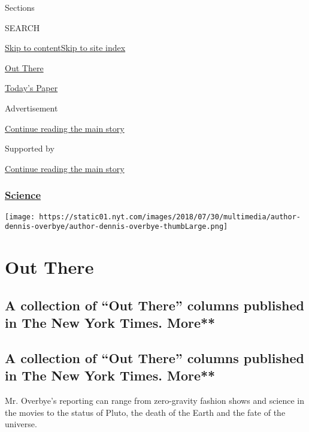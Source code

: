 Sections

SEARCH

\protect\hyperlink{site-content}{Skip to
content}\protect\hyperlink{site-index}{Skip to site index}

\href{https://www.nytimes.com/column/out-there}{Out There}

\href{https://myaccount.nytimes.com/auth/login?response_type=cookie\&client_id=vi}{}

\href{https://www.nytimes.com/section/todayspaper}{Today's Paper}

Advertisement

\protect\hyperlink{after-top}{Continue reading the main story}

Supported by

\protect\hyperlink{after-sponsor}{Continue reading the main story}

\hypertarget{science}{%
\subsubsection{\texorpdfstring{\href{/section/science}{Science}}{Science}}\label{science}}

\texttt{[image: https://static01.nyt.com/images/2018/07/30/multimedia/author-dennis-overbye/author-dennis-overbye-thumbLarge.png]}

\hypertarget{out-there}{%
\section{Out There}\label{out-there}}

\hypertarget{a-collection-of-out-there-columns-published-in-the-new-york-times-more}{%
\subsection{A collection of ``Out There'' columns published in The New
York Times.
More**}\label{a-collection-of-out-there-columns-published-in-the-new-york-times-more}}

\hypertarget{a-collection-of-out-there-columns-published-in-the-new-york-times-more-1}{%
\subsection{A collection of ``Out There'' columns published in The New
York Times.
More**}\label{a-collection-of-out-there-columns-published-in-the-new-york-times-more-1}}

Mr. Overbye's reporting can range from zero-gravity fashion shows and
science in the movies to the status of Pluto, the death of the Earth and
the fate of the universe.

